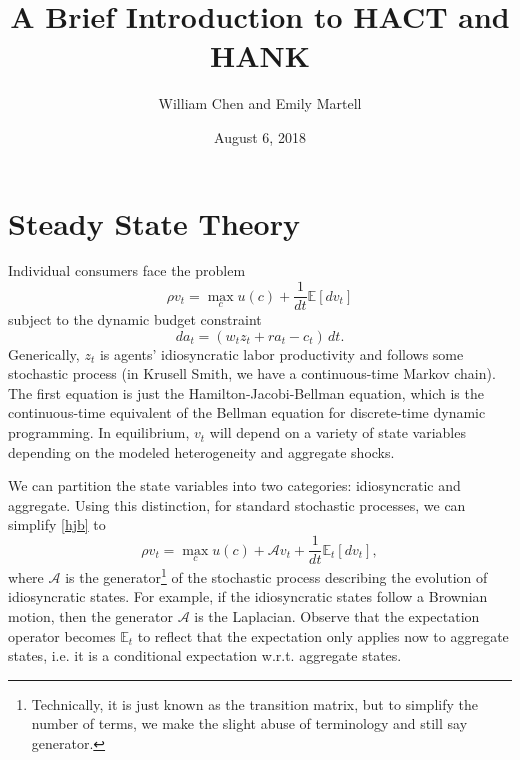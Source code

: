 \documentclass[12 pt, oneside]{article}
\title{A Brief Introduction to HACT and HANK}
\author{William Chen and Emily Martell}
\date{August 6, 2018}
\theoremstyle{definition}
\theoremstyle{definition}
\theoremstyle{definition}
\newcommand{\E}{\mathbb{E}}
\newcommand{\calA}{\mathcal{A}}
\begin{document}
\maketitle
{}



\section{Steady State Theory}
Individual consumers face the problem
\begin{equation}
\rho v_t = \max_c u(c) + \dfrac{1}{dt}\E[dv_t]
\label{hjb}
\end{equation}
subject to the dynamic budget constraint
\begin{equation}
\label{wealth law of motion}
da_t = \left(w_tz_t + ra_t - c_t\right)\,dt.
\end{equation}
Generically, $z_t$ is agents' idiosyncratic labor productivity and follows some stochastic process (in Krusell Smith, we have a continuous-time Markov chain). The first equation is just the Hamilton-Jacobi-Bellman equation, which is the continuous-time equivalent of the Bellman equation for discrete-time dynamic programming. In equilibrium, $v_t$ will depend on a variety of state variables depending on the modeled heterogeneity and aggregate shocks.

We can partition the state variables into two categories: idiosyncratic and aggregate. Using this distinction, for standard stochastic processes, we can simplify \eqref{hjb} to
\begin{equation}\label{hjb simplified}
\rho v_t = \max_c u(c) + \calA v_t + \dfrac{1}{dt}\E_t[dv_t],
\end{equation}
where $\calA$ is the generator\footnote{Technically, it is just known as the transition matrix, but to simplify the number of terms, we make the slight abuse of terminology and still say generator.} of the stochastic process describing the evolution of idiosyncratic states. For example, if the idiosyncratic states follow a Brownian motion, then the generator $\calA$ is the Laplacian. Observe that the expectation operator becomes $\E_t$ to reflect that the expectation only applies now to aggregate states, i.e. it is a conditional expectation w.r.t. aggregate states.
\end{document}

